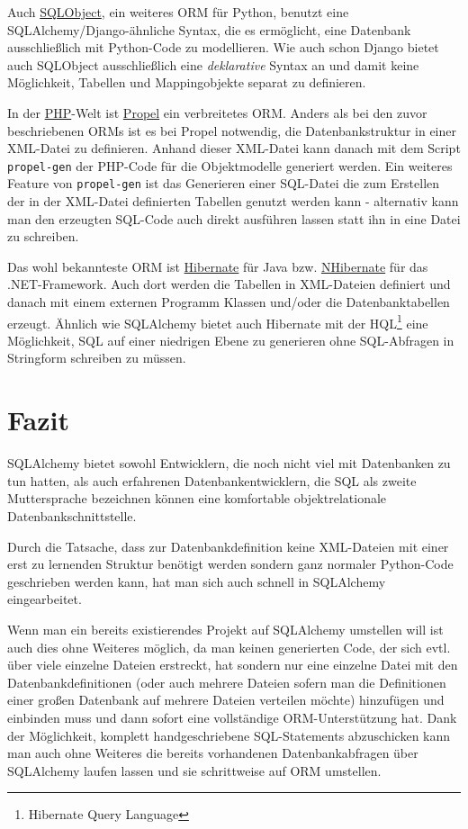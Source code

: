 Auch \href{http://www.sqlobject.org}{SQLObject}, ein weiteres ORM für Python,
benutzt eine SQLAlchemy/Django-ähnliche Syntax, die es ermöglicht, eine
Datenbank ausschließlich mit Python-Code zu modellieren. Wie auch schon Django
bietet auch SQLObject ausschließlich eine \emph{deklarative} Syntax an und damit
keine Möglichkeit, Tabellen und Mappingobjekte separat zu definieren.

In der \href{http://www.php.net}{PHP}-Welt ist
\href{http://www.propelorm.org}{Propel} ein verbreitetes ORM. Anders als bei den
zuvor beschriebenen ORMs ist es bei Propel notwendig, die Datenbankstruktur in
einer XML-Datei zu definieren. Anhand dieser XML-Datei kann danach mit dem
Script \texttt{propel-gen} der PHP-Code für die Objektmodelle generiert werden.
Ein weiteres Feature von \texttt{propel-gen} ist das Generieren einer SQL-Datei
die zum Erstellen der in der XML-Datei definierten Tabellen genutzt werden kann
- alternativ kann man den erzeugten SQL-Code auch direkt ausführen lassen statt
ihn in eine Datei zu schreiben.

Das wohl bekannteste ORM ist \href{http://www.hibernate.org/}{Hibernate} für
Java bzw. \href{http://nhforge.org/}{NHibernate} für das .NET-Framework. Auch
dort werden die Tabellen in XML-Dateien definiert und danach mit einem externen
Programm Klassen und/oder die Datenbanktabellen erzeugt. Ähnlich wie SQLAlchemy
bietet auch Hibernate mit der HQL\footnote{Hibernate Query Language} eine
Möglichkeit, SQL auf einer niedrigen Ebene zu generieren ohne SQL-Abfragen in
Stringform schreiben zu müssen.


\section{Fazit}

SQLAlchemy bietet sowohl Entwicklern, die noch nicht viel mit Datenbanken zu tun
hatten, als auch erfahrenen Datenbankentwicklern, die SQL als zweite
Muttersprache bezeichnen können eine komfortable objektrelationale
Datenbankschnittstelle.

Durch die Tatsache, dass zur Datenbankdefinition keine XML-Dateien mit einer
erst zu lernenden Struktur benötigt werden sondern ganz normaler Python-Code
geschrieben werden kann, hat man sich auch schnell in SQLAlchemy eingearbeitet.

Wenn man ein bereits existierendes Projekt auf SQLAlchemy umstellen will ist
auch dies ohne Weiteres möglich, da man keinen generierten Code, der sich evtl.
über viele einzelne Dateien erstreckt, hat sondern nur eine einzelne Datei mit
den Datenbankdefinitionen (oder auch mehrere Dateien sofern man die Definitionen
einer großen Datenbank auf mehrere Dateien verteilen möchte) hinzufügen und
einbinden muss und dann sofort eine vollständige ORM-Unterstützung hat. Dank der
Möglichkeit, komplett handgeschriebene SQL-Statements abzuschicken kann man auch
ohne Weiteres die bereits vorhandenen Datenbankabfragen über SQLAlchemy laufen
lassen und sie schrittweise auf ORM umstellen.

